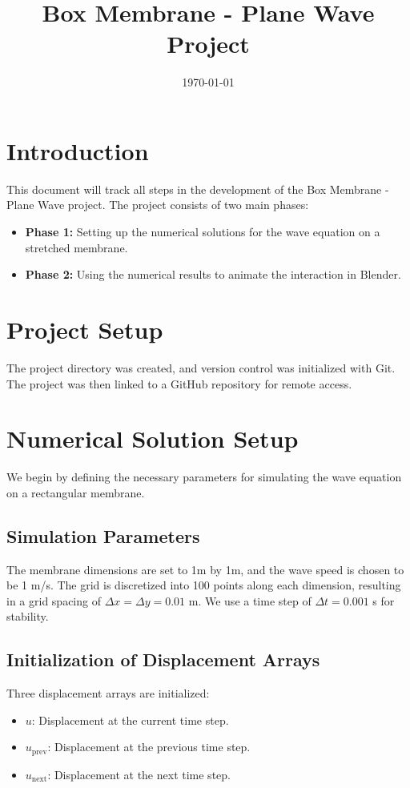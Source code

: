 \documentclass{article}
\begin{document}
\title{Box Membrane - Plane Wave Project}
\author{}
\date{\today}
\maketitle

\section{Introduction}
This document will track all steps in the development of the Box Membrane - Plane Wave project. The project consists of two main phases:
\begin{itemize}
    \item \textbf{Phase 1:} Setting up the numerical solutions for the wave equation on a stretched membrane.
    \item \textbf{Phase 2:} Using the numerical results to animate the interaction in Blender.
\end{itemize}

\section{Project Setup}
The project directory was created, and version control was initialized with Git. The project was then linked to a GitHub repository for remote access.

\section{Numerical Solution Setup}

We begin by defining the necessary parameters for simulating the wave equation on a rectangular membrane.

\subsection{Simulation Parameters}
The membrane dimensions are set to 1m by 1m, and the wave speed is chosen to be 1 m/s. The grid is discretized into 100 points along each dimension, resulting in a grid spacing of $\Delta x = \Delta y = 0.01$ m. We use a time step of $\Delta t = 0.001$ s for stability. 

\subsection{Initialization of Displacement Arrays}
Three displacement arrays are initialized:
\begin{itemize}
    \item $u$: Displacement at the current time step.
    \item $u_{\text{prev}}$: Displacement at the previous time step.
    \item $u_{\text{next}}$: Displacement at the next time step.
\end{itemize}
\end{document}
